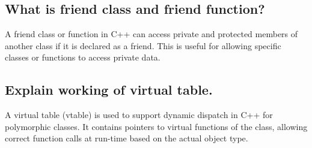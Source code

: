 \subsection{What is friend class and friend function?}
A friend class or function in C++ can access private and protected members of another class if it is declared as a friend. This is useful for allowing specific classes or functions to access private data.

\subsection{Explain working of virtual table.}
A virtual table (vtable) is used to support dynamic dispatch in C++ for polymorphic classes. It contains pointers to virtual functions of the class, allowing correct function calls at run-time based on the actual object type.

\begin{tcolorbox}[title=]
\begin{verbatim}
    
\end{verbatim}
\end{tcolorbox}